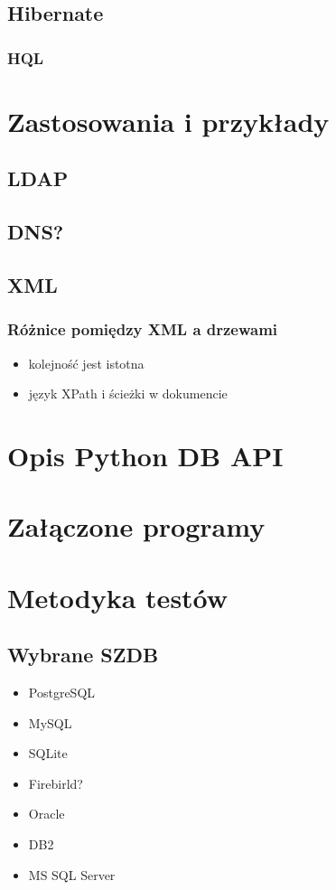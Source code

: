 \documentclass[10pt,a4paper,oneside]{book}
\begin{document}
\section{Hibernate}
\subsection{HQL}
\chapter{Zastosowania i przykłady}

\section{LDAP}
\section{DNS?}
\section{XML}
\subsection{Różnice pomiędzy XML a drzewami}
\begin{itemize}
 \item kolejność jest istotna
 \item język XPath i ścieżki w dokumencie
\end{itemize}

\appendix

\chapter{Opis Python DB API}

\chapter{Załączone programy}

\chapter{Metodyka testów}
\section{Wybrane SZDB}
\begin{itemize}
 \item PostgreSQL
 \item MySQL
 \item SQLite
 \item Firebirld?
 \item Oracle
 \item DB2
 \item MS SQL Server
\end{itemize}
\end{document}
